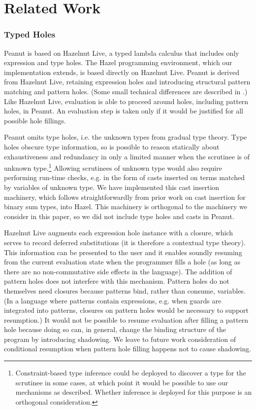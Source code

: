 \section{Related Work}

\subsubsection{Typed Holes}
Peanut is based on Hazelnut Live, a typed lambda calculus that includes only expression and type holes.
The Hazel programming environment, which our implementation extends, is based directly on Hazelnut Live. 
Peanut is derived from Hazelnut Live, retaining expression holes and introducing  
structural pattern matching and pattern holes. (Some small technical differences are described in .) 
Like Hazelnut Live, evaluation is able to proceed around holes, including pattern holes, in Peanut. An evaluation step is taken 
only if it would be justified for all possible hole fillings.

Peanut omits type holes, i.e. the unknown types from gradual type theory. Type holes obscure type information, so 
is possible to reason statically about exhaustiveness and redundancy in only a limited manner when the scrutinee is of unknown type.\footnote{Constraint-based type inference could be deployed to discover a type for the scrutinee in some cases, at which point it would be possible to use our mechanisms as described. Whether inference is deployed for this purpose is an orthogonal consideration.} Allowing scrutinees of unknown type would also require performing run-time checks, e.g. in the form of casts inserted on terms matched by variables of unknown type. 
We have implemented this cast insertion machinery, which follows straightforwardly from prior work on cast insertion for binary sum types, into Hazel. This machinery is orthogonal to the machinery
we consider in this paper, so we did not include type holes and casts in Peanut.

Hazelnut Live augments each expression hole instance with a closure, which serves to record deferred substitutions 
(it is therefore a contextual type theory). This information can be presented to the user and it enables soundly resuming from the current evaluation state when the programmer fills a hole (as long as there are no non-commutative side effects in the language).
The addition of pattern holes does not interfere with this mechanism. Pattern holes do not themselves need closures because patterns bind,
rather than consume, variables. (In a language where patterns contain expressions, e.g. when guards are integrated into patterns, closures on pattern holes would be necessary to support resumption.) It would not be possible to resume evaluation after filling a pattern hole because doing so can, in general, change the binding structure of the program by introducing shadowing. We leave to future work consideration of 
conditional resumption when pattern hole filling happens not to cause shadowing.

